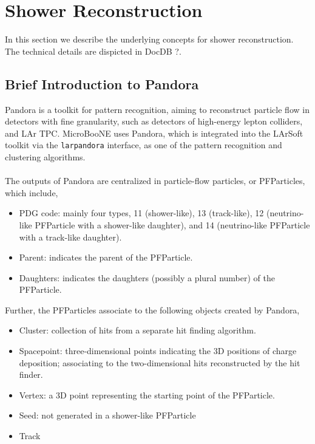 \section{Shower Reconstruction}

In this section we describe the underlying concepts for shower reconstruction.
The technical details are dispicted in DocDB ?.

\subsection{Brief Introduction to Pandora}

Pandora is a toolkit for pattern recognition, aiming to 
reconstruct particle flow in detectors with fine granularity, such as
detectors of high-energy lepton colliders, and LAr TPC.
MicroBooNE uses Pandora, which is integrated into the LArSoft toolkit
via the \texttt{larpandora} interface,
as one of the pattern recognition and clustering algorithms. \\
\\
The outputs of Pandora are centralized in particle-flow particles, 
or PFParticles, which include,
\begin{itemize}
\item PDG code: mainly four types, 11 (shower-like),
      13 (track-like), 12 (neutrino-like PFParticle with a shower-like
      daughter), and 14 (neutrino-like PFParticle with a track-like daughter).
\item Parent: indicates the parent of the PFParticle.
\item Daughters: indicates the daughters (possibly a plural number) of
      the PFParticle.
\end{itemize}
Further, the PFParticles associate to the following objects created
by Pandora,
\begin{itemize}
\item Cluster: collection of hits from a separate hit finding algorithm.
\item Spacepoint: three-dimensional points indicating the 3D positions
      of charge deposition; associating to the two-dimensional hits
      reconstructed by the hit finder.
\item Vertex: a 3D point representing the starting point of the PFParticle.
\item Seed: not generated in a shower-like PFParticle
\item Track
\end{itemize}

